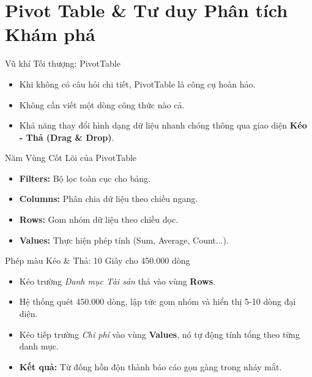 \documentclass[aspectratio=169,12pt]{beamer}
\begin{document}
\section{Pivot Table \& Tư duy Phân tích Khám phá}
\begin{frame}
    \tableofcontents[currentsection]
\end{frame}

\begin{frame}{Vũ khí Tối thượng: PivotTable}
    \begin{itemize}
        \item Khi không có câu hỏi chi tiết, PivotTable là công cụ hoàn hảo.
        \item Không cần viết một dòng công thức nào cả.
        \item Khả năng thay đổi hình dạng dữ liệu nhanh chóng thông qua giao diện \textbf{Kéo - Thả (Drag \& Drop)}.
    \end{itemize}
\end{frame}

\begin{frame}{Năm Vùng Cốt Lõi của PivotTable}
    \begin{itemize}
        \item \textbf{Filters:} Bộ lọc toàn cục cho bảng.
        \item \textbf{Columns:} Phân chia dữ liệu theo chiều ngang.
        \item \textbf{Rows:} Gom nhóm dữ liệu theo chiều dọc.
        \item \textbf{Values:} Thực hiện phép tính (Sum, Average, Count...).
    \end{itemize}
\end{frame}

\begin{frame}{Phép màu Kéo \& Thả: 10 Giây cho 450.000 dòng}
    \begin{itemize}
        \item Kéo trường \textit{Danh mục Tài sản} thả vào vùng \textbf{Rows}.
        \item Hệ thống quét 450.000 dòng, lập tức gom nhóm và hiển thị 5-10 dòng đại diện.
        \item Kéo tiếp trường \textit{Chi phí} vào vùng \textbf{Values}, nó tự động tính tổng theo từng danh mục.
        \item \textbf{Kết quả:} Từ đống hỗn độn thành báo cáo gọn gàng trong nháy mắt.
    \end{itemize}
\end{frame}
\end{document}
